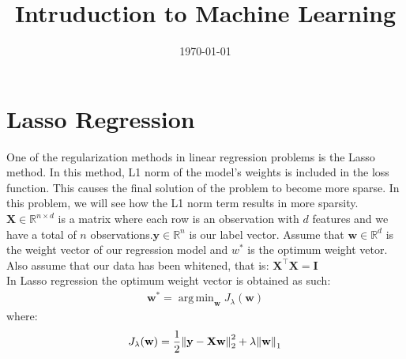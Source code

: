 \documentclass[12pt]{article}
\title{Intruduction to Machine Learning}
\date{\today}
\DeclareMathOperator*{\argmin}{arg\,min}
\begin{document}
\maketitlepage
\maketitlestart

\section{Lasso Regression}
One of the regularization methods in linear regression problems is the Lasso method. In this method, L1 norm of the model’s weights is included in the loss function. This causes the final solution of the problem to become more sparse. In this problem, we will see how the L1 norm term results in more sparsity.\\
$\mathbf{X} \in \mathbb{R}^{n\times d}$ is a matrix where each row is an observation with $d$ features and we have a total of $n$ observations.$\mathbf{y} \in \mathbb{R}^{n}$ is our label vector. Assume that $\boldsymbol{w} \in \mathbb{R}^d$ is the weight vector of our regression model and $w^{*}$ is the optimum weight vetor. Also assume that our data has been whitened, that is: $\mathbf{X}^\top \mathbf{X} = \mathbf{I}$\\
In Lasso regression the optimum weight vector is obtained as such:
\begin{gather*}
    \mathbf{w}^{*} = \argmin_{\mathbf{w}} J_{\lambda}(\mathbf{w})
\end{gather*}
where:
\begin{gather*}
    J_{\lambda}(\mathbf{w}) = \frac{1}{2} \norm{\mathbf{y} - \mathbf{X}\mathbf{w}}_{2}^{2} + \lambda \norm{\mathbf{w}}_1
\end{gather*}
\end{document}
